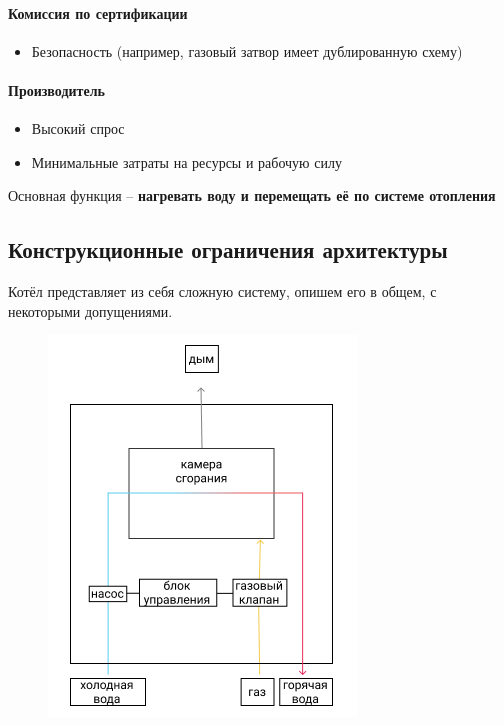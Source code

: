 \documentclass[bibliography=totocnumbered]{scrartcl}
\begin{document}
\paragraph{Комиссия по сертификации}
\begin{itemize}
  \item Безопасность (например, газовый затвор имеет дублированную схему)
\end{itemize}

\paragraph{Производитель}
\begin{itemize}
  \item Высокий спрос
  \item Минимальные затраты на ресурсы и рабочую силу
\end{itemize}
Основная функция -- \textbf{нагревать воду и перемещать её по системе отопления}

\subsection{Конструкционные ограничения архитектуры}
Котёл представляет из себя сложную систему, опишем его в общем, с некоторыми допущениями.

\begin{figure}[htp]
  \centering
  \includegraphics[scale=1.00]{arch.png}
\end{figure}
\end{document}
